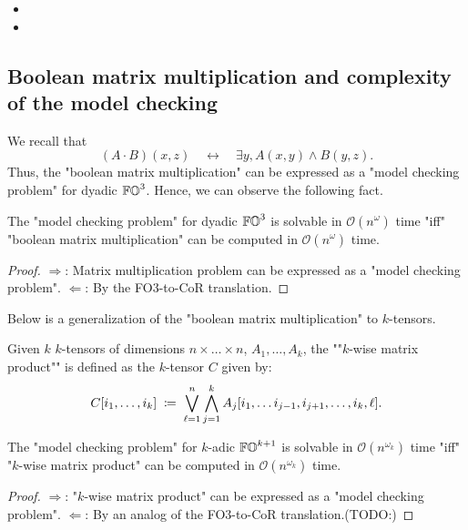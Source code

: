 \begin{yoshiki}
\begin{itemize}
    \item {}
    \item {}
\end{itemize}
\end{yoshiki}

\subsection{Boolean matrix multiplication and complexity of the model checking}
We recall that
\[(A \cdot B)(x, z) \quad\leftrightarrow\quad \exists y, A(x, y) \land B(y, z).\]
Thus, the "boolean matrix multiplication" can be expressed as a "model checking problem" for dyadic $\mathbb{FO}^{3}$.
Hence, we can observe the following fact.
\begin{proposition}\label{proposition: FO3 model checking and matrix multiplication}
  The "model checking problem" for dyadic $\mathbb{FO}^{3}$ is solvable in $\mathcal{O}(n^{\omega})$ time
  "iff"
  "boolean matrix multiplication" can be computed in $\mathcal{O}(n^{\omega})$ time.
\end{proposition}
\begin{proof}
  $\Longrightarrow$: 
  Matrix multiplication problem can be expressed as a "model checking problem".
  $\Longleftarrow$: By the FO3-to-CoR translation.
\end{proof}

Below is a generalization of the "boolean matrix multiplication" to $k$-tensors.
\begin{definition}\label{definition: k-wise matrix product}
  Given $k$ $k$-tensors of dimensions $n \times \dots \times n$,
  $A_1, \dots, A_k$, 
  the ""$k$-wise matrix product"" is defined as the $k$-tensor $C$ given by:
  \[C[i_1, \dots, i_k] \;\coloneq\; \bigvee_{\ell = 1}^{n} \bigwedge_{j = 1}^{k} A_j[i_1, \dots i_{j-1}, i_{j+1}, \dots, i_{k}, \ell].\]
\end{definition}

\begin{proposition}\label{proposition: FOk model checking and matrix multiplication}
  The "model checking problem" for $k$-adic $\mathbb{FO}^{k+1}$ is solvable in $\mathcal{O}(n^{\omega_k})$ time
  "iff"
  "$k$-wise matrix product" can be computed in $\mathcal{O}(n^{\omega_k})$ time.
\end{proposition}
\begin{proof}
  $\Longrightarrow$: 
  "$k$-wise matrix product" can be expressed as a "model checking problem".
  $\Longleftarrow$: By an analog of the FO3-to-CoR translation.(TODO:)
\end{proof}


